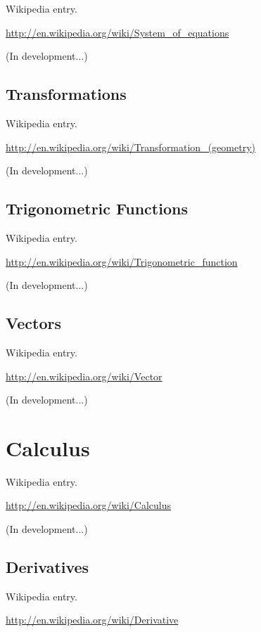 \documentclass[12pt,twoside]{book}
\begin{document}
Wikipedia entry.

\href{http://en.wikipedia.org/wiki/System_of_equations}{http://en.wikipedia.org/wiki/System\_of\_equations}

(In development...)

\subsection[Transformations]{Transformations}

Wikipedia entry.

\href{http://en.wikipedia.org/wiki/Transformation_(geometry)}{http://en.wikipedia.org/wiki/Transformation\_(geometry)}

(In development...)

\subsection[Trigonometric Functions]{ Trigonometric Functions}

Wikipedia entry.

\href{http://en.wikipedia.org/wiki/Trigonometric_function}{http://en.wikipedia.org/wiki/Trigonometric\_function}

(In development...)

\subsection[Vectors]{Vectors}

Wikipedia entry.

\href{http://en.wikipedia.org/wiki/Vector}{http://en.wikipedia.org/wiki/Vector}

(In development...)

\section[Calculus]{Calculus}

Wikipedia entry.

\href{http://en.wikipedia.org/wiki/Calculus}{http://en.wikipedia.org/wiki/Calculus}

(In development...)

\subsection[Derivatives]{Derivatives}

Wikipedia entry.

\href{http://en.wikipedia.org/wiki/Derivative}{http://en.wikipedia.org/wiki/Derivative}
\end{document}
